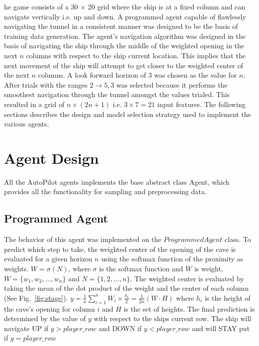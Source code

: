 \documentclass[10pt,journal,compsoc]{IEEEtran}
\begin{document}
he game consists
of a 30 $\times$ 20 grid where the ship is at a fixed column and can navigate vertically i.e. up and 
down. A programmed agent capable of flawlessly navigating the tunnel in a consistent manner was designed
to be the basis of training data generation. The agent's navigation algorithm was designed in the basis 
of navigating the ship through the middle of the weighted opening in the next $n$ columns with respect to 
the ship current location. This implies that the next movement of the ship will attempt to get closer to 
the weighted center of the next $n$ columns. A look forward horizon of $3$ was chosen as the value for $n$.
After trials with the ranges $2 \to 5, 3$ was selected because it performs the smoothest navigation through
the tunnel amongst the values trialed. This resulted in a grid of $n \times (2n + 1)$ i.e. $3 \times 7 = 21$ 
input features. The following sections describes the design and model selection strategy used to implement
the various agents. 

\section{Agent Design}
All the AutoPilot agents implements the base abstract class Agent, which provides all the functionality for 
sampling and preprocessing data. 


\subsection{Programmed Agent}

The behavior of this agent was implemented on the $ProgrammedAgent$ class. To predict which step to take, the
weighted center of the opening of the cave is evaluated for a given horizon $n$ using the softmax function 
of the proximity as weights. $W = \sigma(N)$,
where $\sigma$ is the softmax function and $W$ is weight, $W = \{w_1, w_2, ..., w_n\}$ and $N = \{1, 2, ..., 
n\}$. The weighted center is evaluated by taking the mean of the dot product of the weight and 
the center of each column (See Fig.~\ref{fig:stage}). $y = \frac{1}{n}\sum\limits_{i=1}^{n}W_i \times \frac{h_i}{2} = \frac{1}{2n}
(W \cdot H)$ where $h_i$ is the height of the cave's opening for column $i$ and $H$ is the set of heights. 
The final prediction is determined by the value of $y$ with 
respect to the ships current row. The ship will navigate UP if $y > player\_row$ and DOWN if $y 
< player\_row$ and will STAY put if $y = player\_row$
\end{document}
